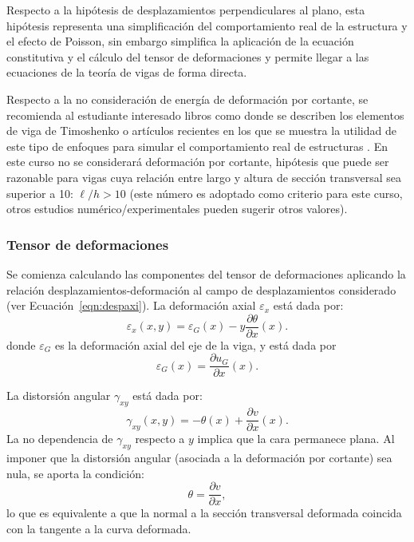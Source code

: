 Respecto a la hipótesis de desplazamientos perpendiculares al plano, esta hipótesis representa una simplificación del comportamiento real de la estructura y el efecto de Poisson, sin embargo simplifica la aplicación de la ecuación constitutiva y el cálculo del tensor de deformaciones y permite llegar a las ecuaciones de la teoría de vigas de forma directa.

Respecto a la no consideración de energía de deformación por cortante, se recomienda al estudiante interesado libros como \citep{Onate2013} donde se describen los elementos de viga de Timoshenko o  artículos recientes en los que se muestra la utilidad de este tipo de enfoques para simular el comportamiento real de estructuras \citep{Bui2014}. %
%
En este curso no se considerará deformación por cortante, hipótesis que puede ser razonable para vigas cuya relación entre largo y altura de sección transversal sea superior a 10: $\ell/h > 10$ (este número es adoptado como criterio para este curso, otros estudios numérico/experimentales pueden sugerir otros valores).

\subsubsection{Tensor de deformaciones}

Se comienza calculando las componentes del tensor de deformaciones aplicando la relación desplazamientos-deformación al campo de desplazamientos considerado (ver Ecuación~\eqref{eqn:despaxi}). %
%
La deformación axial  $\varepsilon_x$ está dada por:
%
\begin{equation}\label{eqn:expdef}
\varepsilon_x(x,y) =  \varepsilon_G (x) -y \frac{\partial \theta}{\partial x}(x).
\end{equation}
%
donde $\varepsilon_G$ es la deformación axial del eje de la viga, y está dada por
%
\begin{equation}
\varepsilon_G(x) =  \frac{\partial u_G}{\partial x} (x) .
\end{equation}


La distorsión angular $\gamma_{xy}$ está dada por:
\begin{equation}
  \gamma_{xy}(x,y) = -\theta(x) + \frac{\partial v}{\partial x} (x).
\end{equation}
%
La no dependencia de $\gamma_{xy}$ respecto a $y$ implica que la cara permanece plana. %
%
Al imponer que la distorsión angular (asociada a la deformación por cortante) sea nula, se aporta la condición:
\begin{equation}
\boxed{
\theta = \frac{\partial v}{\partial x},
}
\end{equation}
lo que es equivalente a que la normal a la sección transversal deformada coincida con la tangente a la curva deformada.

